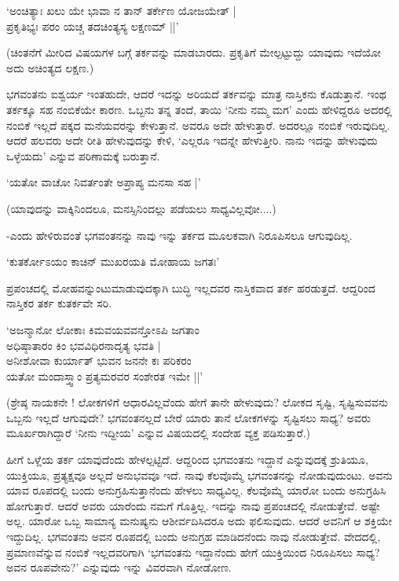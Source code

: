 \begin{shloka}
`ಅಂಚಿತ್ಯಾಃ ಖಲು ಯೇ ಭಾವಾ ನ ತಾನ್ ತರ್ಕೇಣ ಯೋಜಯೇತ್‌ |\\
ಪ್ರಕೃತಿಭ್ಯಃ ಪರಂ ಯಚ್ಚ ತದಚಿಂತ್ಯಸ್ಯ ಲಕ್ಷಣಮ್ ||'
\end{shloka}

(ಚಿಂತನೆಗೆ ಮೀರಿದ ವಿಷಯಗಳ ಬಗ್ಗೆ ತರ್ಕವನ್ನು ಮಾಡಬಾರದು. ಪ್ರಕೃತಿಗೆ ಮೇಲ್ಪಟ್ಟುದ್ದು ಯಾವುದು ಇದೆಯೋ ಅದು ಅಚಿಂತ್ಯದ ಲಕ್ಷಣ.)

ಭಗವಂತನು ಐಶ್ವರ್ಯ ಇಂತಹುದೇ, ಆದರೆ ಇದನ್ನು ಅರಿಯದೆ ತರ್ಕವನ್ನು ಮಾತ್ರ ನಾಸ್ತಿಕನು ಕೊಡುತ್ತಾನೆ. ಇಂಥ ತರ್ಕಕ್ಕೂ ಸಹ ನಂಬಿಕೆಯೇ ಕಾರಣ. ಒಬ್ಬನು ತನ್ನ ತಂದೆ, ತಾಯಿ `ನೀನು ನಮ್ಮ ಮಗ' ಎಂದು ಹೇಳಿದ್ದರೂ ಅದರಲ್ಲಿ ನಂಬಿಕೆ ಇಲ್ಲದೆ ಪಕ್ಕದ ಮನೆಯವರನ್ನು ಕೇಳುತ್ತಾನೆ. ಅವರೂ ಅದೇ ಹೇಳುತ್ತಾರೆ. ಅದರಲ್ಲೂ ನಂಬಿಕೆ ಇರುವುದಿಲ್ಲ. ಆದರೆ ಹಲವರು ಅದೇ ರೀತಿ ಹೇಳುವುದನ್ನು ಕೇಳಿ, `ಎಲ್ಲರೂ ಇದನ್ನೇ ಹೇಳುತ್ತೀರಿ. ನಾನು ಇದನ್ನು ಹೇಳುವುದು ಒಳ್ಳೆಯದು' ಎನ್ನುವ ಪರಿಣಾಮಕ್ಕೆ ಬರುತ್ತಾನೆ.

\begin{shloka}
`ಯತೋ ವಾಚೋ ನಿವರ್ತಂತೇ ಅಪ್ರಾಪ್ಯ ಮನಸಾ ಸಹ |'
\end{shloka}

(ಯಾವುದನ್ನು ವಾಕ್ಕಿನಿಂದಲೂ, ಮನಸ್ಸಿನಿಂದಲ್ಲು ಪಡೆಯಲು ಸಾಧ್ಯವಿಲ್ಲವೋ....)

-ಎಂದು ಹೇಳಿರುವಂತೆ ಭಗವಂತನನ್ನು ನಾವು ಇನ್ನು ತರ್ಕದ ಮೂಲಕವಾಗಿ ನಿರೂಪಿಸಲೂ ಆಗುವುದಿಲ್ಲ.

\begin{shloka}
`ಕುತರ್ಕೋಽಯಂ ಕಾಚಿನ್ ಮುಖರಯತಿ ಮೋಹಾಯ ಜಗತಃ'
\end{shloka}

ಪ್ರಪಂಚದಲ್ಲಿ ಮೋಹವನ್ನುಂಟುಮಾಡುವುದಕ್ಕಾಗಿ ಬುದ್ಧಿ ಇಲ್ಲದವರ ನಾಸ್ತಿಕವಾದ ತರ್ಕ ಹರಡುತ್ತದೆ. ಆದ್ದರಿಂದ ನಾಸ್ತಿಕರ ತರ್ಕ ಕುತರ್ಕವೇ ಸರಿ.

\begin{shloka}
`ಅಜನ್ಮಾನೋ ಲೋಕಾಃ ಕಿಮವಯವವನ್ತೋಽಪಿ ಜಗತಾಂ\\
ಅಧಿಷ್ಠಾತಾರಂ ಕಿಂ ಭವವಿಧಿರನಾದೃತ್ಯ ಭವತಿ |\\
ಅನೀಶೋವಾ ಕುರ್ಯಾತ್ ಭುವನ ಜನನೇ ಕಃ ಪರಿಕರಂ\\
ಯತೋ ಮಂದಾಸ್ತ್ವಾಂ ಪ್ರತ್ಯಮರವರ ಸಂಶೇರತ ಇಮೇ ||'
\end{shloka}

(ಶ್ರೇಷ್ಠ ನಾಯಕನೇ ! ಲೋಕಗಳಿಗೆ ಆಧಾರವಿಲ್ಲವೆಂದು ಹೇಗೆ ತಾನೇ ಹೇಳುವುದು? ಲೋಕದ ಸೃಷ್ಟಿ, ಸೃಷ್ಟಿಸುವವನು ಒಬ್ಬನು ಇಲ್ಲದೆ ಆಗುವುದೇ? ಭಗವಂತನಲ್ಲದೆ ಬೇರೆ ಯಾರು ತಾನೆ ಲೋಕಗಳನ್ನು ಸೃಷ್ಟಿಸಲು ಸಾಧ್ಯ? ಅವರು ಮೂರ್ಖರಾಗಿದ್ದಾರೆ `ನೀನು ಇದ್ದೀಯ' ಎನ್ನುವ ವಿಷಯದಲ್ಲಿ ಸಂದೇಹ ವ್ಯಕ್ತ ಪಡಿಸುತ್ತಾರೆ.)

ಹೀಗೆ ಒಳ್ಲೆಯ ತರ್ಕ ಯಾವುದೆಂದು ಹೇಳಲ್ಪಟ್ಟಿದೆ. ಆದ್ದರಿಂದ ಭಗವಂತನು ಇದ್ದಾನೆ ಎನ್ನುವುದಕ್ಕೆ ಶ್ರುತಿಯೂ, ಯುಕ್ತಿಯೂ, ಪ್ರತ್ಯಕ್ಷವೂ ಅಲ್ಲದೆ ಅನುಭವವೂ ಇದೆ. ನಾವು ಕೆಲವೊಮ್ಮೆ ಭಗವಂತನನ್ನು ನೋಡುವುದುಂಟು. ಅವನು ಯಾವ ರೂಪದಲ್ಲಿ ಬಂದು ಅನುಗ್ರಹಿಸುತ್ತಾನೆಂದು ಹೇಳಲು ಸಾಧ್ಯವಿಲ್ಲ. ಕೆಲವೊಮ್ಮೆ ಯಾರೋ ಬಂದು ಅನುಗ್ರಹಿಸಿ ಹೋಗುತ್ತಾರೆ. ಆದರೆ ಅವರು ಯಾರೆಂದು ನಮಗೆ ಗೊತ್ತಿಲ್ಲ. ಇದನ್ನು ನಾವು ಪ್ರಪಂಚದಲ್ಲಿ ನೋಡುತ್ತೇವೆ. ಅಷ್ಟೇ ಅಲ್ಲ. ಯಾರೋ ಒಬ್ಬ ಸಾಮಾನ್ಯ ಮನುಷ್ಯನು ಆಶೀರ್ವದಿಸಿದರೂ ಅದು ಫಲಿಸುವುದು. ಆದರೆ ಅವನಿಗೆ ಆ ಶಕ್ತಿಯೇ ಇದ್ದುದಿಲ್ಲ. ಭಗವಂತನು ಅವನ ರೂಪದಲ್ಲಿ ಬಂದು ಅನುಗ್ರಹ ಮಾಡಿದನೆಂದು ನಾವು ನೋಡುತ್ತೇವೆ. ವೇದದಲ್ಲಿ, ಪ್ರಮಾಣವೆನ್ನುವ ನಂಬಿಕೆ ಇಲ್ಲದವರಿಗಾಗಿ `ಭಗವಂತನು ಇದ್ದಾನೆಂದು ಹೇಗೆ ಯುಕ್ತಿಯಿಂದ ನಿರೂಪಿಸಲು ಸಾಧ್ಯ? ಅವನ ರೂಪವೇನು?' ಎನ್ನುವುದು ಇನ್ನು ವಿವರವಾಗಿ ನೋಡೋಣ.

